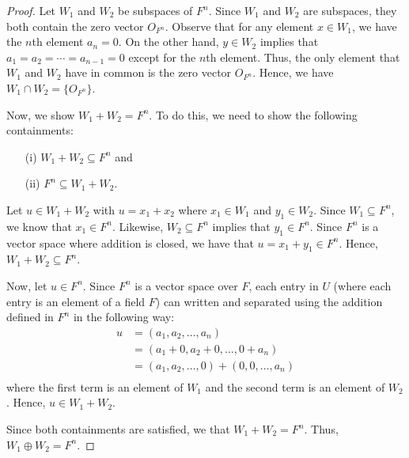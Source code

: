 \begin{proof}
Let \( W_{1}  \) and \( W_{2}  \) be subspaces of \( F^{n} \).  Since \( W_{1}  \) and \( W_{2}  \) are subspaces, they both contain the zero vector \( O_{F^{n}}  \). Observe that for any element \( x \in W_{1}  \), we have the \( n \)th element \( a_{n} = 0  \). On the other hand, \( y \in W_{2}  \) implies that \( a_{1} = a_{2} = \cdots = a_{n-1} = 0  \) except for the \( n \)th element. Thus, the only element that \( W_{1}  \) and \( W_{2}  \) have in common is the zero vector \( O_{F^{n}} \). Hence, we have \( W_{1} \cap W_{2} = \{ O_{F^{n}} \}  \).

Now, we show \( W_{1} + W_{2} = F^{n}  \). To do this, we need to show the following containments:
\begin{enumerate}
    \item[(i)] \( W_{1} + W_{2} \subseteq F^{n} \) and
    \item[(ii)] \( F^{n} \subseteq W_{1} + W_{2} \).
\end{enumerate}

Let \( u \in W_{1} + W_{2}  \) with \( u = x_{1} + x_{2}  \) where \( x_{1} \in W_{1}  \) and \( y_{1} \in W_{2}  \). Since \( W_{1} \subseteq F^{n}  \), we know that \( x_{1} \in F^{n} \). Likewise, \( W_{2} \subseteq F^{n} \) implies that \( y_{1} \in F^{n}  \). Since \( F^{n} \) is a vector space where addition is closed, we have that \( u = x_{1} + y_{1}  \in F^{n} \). Hence, \( W_{1} + W_{2} \subseteq F^{n} \). 

Now, let \( u \in F^{n} \). Since \( F^{n}  \) is a vector space over \( F  \), each entry in \( U \) (where each entry is an element of a field \( F  \)) can written and separated using the addition defined in \( F^{n} \) in the following way:
\begin{align*}
    u &= (a_{1}, a_{2} , \dots, a_{n}) \\ 
      &= (a_{1} + 0 , a_{2} + 0 , \dots, 0 + a_{n}) \\
      &= (a_{1}, a_{2}, \dots, 0 ) + ( 0, 0, \dots, a_{n}) \\
\end{align*}
where the first term is an element of \( W_{1}  \) and the second term is an element of \( W_{2} \). Hence, \( u \in W_{1} + W_{2} \).

Since both containments are satisfied, we that \( W_{1} + W_{2} = F^{n} \). Thus, \( W_{1} \oplus  W_{2} = F^{n}  \).
\end{proof}



